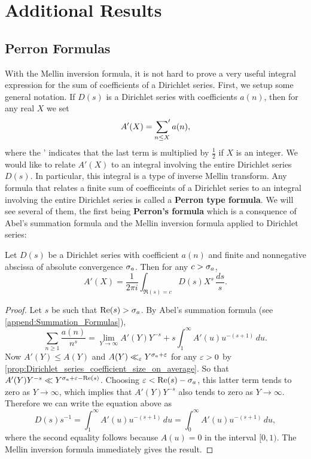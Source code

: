  \chapter{Additional Results}
    \section{Perron Formulas}
      With the Mellin inversion formula, it is not hard to prove a very useful integral expression for the sum of coefficients of a Dirichlet series. First, we setup some general notation. If $D(s)$ is a Dirichlet series with coefficients $a(n)$, then for any real $X$ we set
      \[
        A'(X) = \sideset{}{'}\sum_{n \le X}a(n),
      \]
      where the ' indicates that the last term is multiplied by $\frac{1}{2}$ if $X$ is an integer. We would like to relate $A'(X)$ to an integral involving the entire Dirichlet series $D(s)$. In particular, this integral is a type of inverse Mellin transform. Any formula that relates a finite sum of coefficeints of a Dirichlet series to an integral involving the entire Dirichlet series is called a \textbf{Perron type formula}. We will see several of them, the first being \textbf{Perron's formula} which is a consquence of Abel's summation formula and the Mellin inversion formula applied to Dirichlet series:

      \begin{theorem}
        Let $D(s)$ be a Dirichlet series with coefficient $a(n)$ and finite and nonnegative abscissa of absolute convergence $\sigma_{a}$. Then for any $c > \sigma_{a}$,
        \[
          A'(X) = \frac{1}{2\pi i}\int_{\Re(s) = c}D(s)X^{s}\,\frac{ds}{s}.
        \]
      \end{theorem}
      \begin{proof}
        Let $s$ be such that $\mathrm{Re}(s) > \sigma_{a}$. By Abel's summation formula (see \cref{append:Summation_Formulas}),
        \[
          \sum_{n \ge 1}\frac{a(n)}{n^{s}} = \lim_{Y \to \infty}A'(Y)Y^{-s}+s\int_{1}^{\infty}A'(u)u^{-(s+1)}\,du.
        \]
        Now $A'(Y) \le A(Y)$ and $A(Y) \ll_{\varepsilon} Y^{\sigma_{a}+\varepsilon}$ for any $\varepsilon > 0$ by \cref{prop:Dirichlet_series_coefficient_size_on_average}. So that $A'(Y)Y^{-s} \ll Y^{\sigma_{a}+\varepsilon-\mathrm{Re}(s)}$. Choosing $\varepsilon < \mathrm{Re}(s)-\sigma_{a}$, this latter term tends to zero as $Y \to \infty$, which implies that $A'(Y)Y^{-s}$ also tends to zero as $Y \to \infty$. Therefore we can write the equation above as
        \[
          D(s)s^{-1} = \int_{1}^{\infty}A'(u)u^{-(s+1)}\,du = \int_{0}^{\infty}A'(u)u^{-(s+1)}\,du,
        \]
        where the second equality follows because $A(u) = 0$ in the interval $[0,1)$. The Mellin inversion formula immediately gives the result.
      \end{proof}

